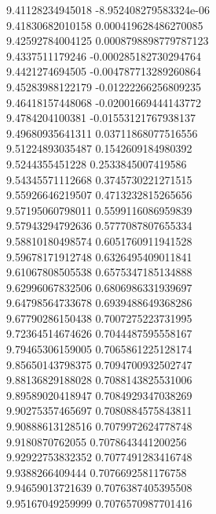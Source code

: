 {9.41128234945018 -8.952408279583324e-06 \\
9.41830682010158 0.000419628486270085 \\
9.42592784004125 0.0008798898779787123 \\
9.4337511179246 -0.000285182730294764 \\
9.4421274694505 -0.004787713289260864 \\
9.45283988122179 -0.01222266256809235 \\
9.46418157448068 -0.02001669444143772 \\
9.4784204100381 -0.01553121767938137 \\
9.49680935641311 0.03711868077516556 \\
9.51224893035487 0.1542609184980392 \\
9.5244355451228 0.2533845007419586 \\
9.54345571112668 0.3745730221271515 \\
9.55926646219507 0.4713232815265656 \\
9.57195060798011 0.5599116086959839 \\
9.57943294792636 0.5777087807655334 \\
9.58810180498574 0.6051760911941528 \\
9.59678171912748 0.6326495409011841 \\
9.61067808505538 0.6575347185134888 \\
9.62996067832506 0.6806986331939697 \\
9.64798564733678 0.6939488649368286 \\
9.67790286150438 0.7007275223731995 \\
9.72364514674626 0.7044487595558167 \\
9.79465306159005 0.7065861225128174 \\
9.85650143798375 0.7094700932502747 \\
9.88136829188028 0.7088143825531006 \\
9.89589020418947 0.7084929347038269 \\
9.90275357465697 0.7080884575843811 \\
9.90888613128516 0.7079972624778748 \\
9.9180870762055 0.7078643441200256 \\
9.92922753832352 0.7077491283416748 \\
9.9388266409444 0.7076692581176758 \\
9.94659013721639 0.7076387405395508 \\
9.95167049259999 0.7076570987701416 \\
}
